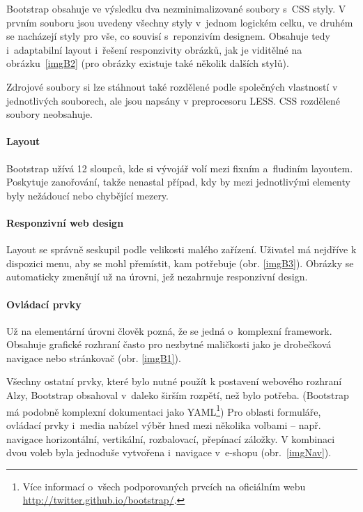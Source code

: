 \documentclass[thesis=B,czech]{FITthesis}[2012/06/26]
\begin{document}
Bootstrap obsahuje ve výsledku dva nezminimalizované soubory s~CSS styly. V prvním souboru jsou uvedeny všechny styly v~jednom logickém celku, ve druhém se nacházejí styly pro vše, co souvisí s~reponzivím designem. Obsahuje tedy i~adaptabilní layout i~řešení responzivity obrázků, jak je viditělné na obrázku~\ref{imgB2} (pro obrázky existuje také několik dalších stylů).

Zdrojové soubory si lze stáhnout také rozdělené podle společných vlastností v jednotlivých souborech, ale jsou napsány v preprocesoru LESS. CSS rozdělené soubory neobsahuje.


\paragraph{Layout}

Bootstrap užívá 12 sloupců, kde si vývojář volí mezi fixním a~fludiním layoutem. Poskytuje zanořování, takže nenastal případ, kdy by mezi jednotlivými elementy byly nežádoucí nebo chybějící mezery. 

\paragraph{Responzivní web design}

Layout se správně seskupil podle velikosti malého zařízení. Uživatel má nejdříve k dispozici menu, aby se mohl přemístit, kam potřebuje (obr. \ref{imgB3}). Obrázky se automaticky zmenšují už na úrovni, jež nezahrnuje responzivní design.



\paragraph{Ovládací prvky}

Už na elementární úrovni člověk pozná, že se jedná o~komplexní framework. Obsahuje grafické rozhraní často pro nezbytné maličkosti jako je drobečková navigace nebo stránkovač (obr. \ref{imgB1}).

Všechny ostatní prvky, které bylo nutné použít k postavení webového rozhraní Alzy, Bootstrap obsahoval v~daleko širším rozpětí, než bylo potřeba. (Bootstrap má podobně komplexní dokumentaci jako YAML\footnote{Více informací o~všech podporovaných prvcích na oficiálním webu \\ \url{http://twitter.github.io/bootstrap/}.}) Pro oblasti formuláře, ovládací prvky i~media nabízel výběr hned mezi několika volbami -- např. navigace horizontální, vertikální, rozbalovací, přepínací záložky. V kombinaci dvou voleb byla jednoduše vytvořena i~navigace v~e-shopu (obr.~\ref{imgNav}).
\end{document}
